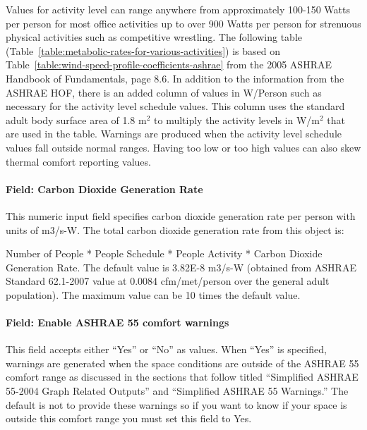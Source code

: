 Values for activity level can range anywhere from approximately 100-150 Watts per person for most office activities up to over 900 Watts per person for strenuous physical activities such as competitive wrestling. The following table (Table~\ref{table:metabolic-rates-for-various-activities}) is based on Table~\ref{table:wind-speed-profile-coefficients-ashrae} from the 2005 ASHRAE Handbook of Fundamentals, page 8.6. In addition to the information from the ASHRAE HOF, there is an added column of values in W/Person such as necessary for the activity level schedule values. This column uses the standard adult body surface area of 1.8 m\(^{2}\) to multiply the activity levels in W/m\(^{2}\) that are used in the table. Warnings are produced when the activity level schedule values fall outside normal ranges. Having too low or too high values can also skew thermal comfort reporting values.

\paragraph{Field: Carbon Dioxide Generation Rate}\label{field-carbon-dioxide-generation-rate}

This numeric input field specifies carbon dioxide generation rate per person with units of m3/s-W. The total carbon dioxide generation rate from this object is:

Number of People * People Schedule * People Activity * Carbon Dioxide Generation Rate. The default value is 3.82E-8 m3/s-W (obtained from ASHRAE Standard 62.1-2007 value at 0.0084 cfm/met/person over the general adult population). The maximum value can be 10 times the default value.

\paragraph{Field: Enable ASHRAE 55 comfort warnings}\label{field-enable-ashrae-55-comfort-warnings}

This field accepts either ``Yes'' or ``No'' as values. When ``Yes'' is specified, warnings are generated when the space conditions are outside of the ASHRAE 55 comfort range as discussed in the sections that follow titled ``Simplified ASHRAE 55-2004 Graph Related Outputs'' and ``Simplified ASHRAE 55 Warnings.'' The default is not to provide these warnings so if you want to know if your space is outside this comfort range you must set this field to Yes.

